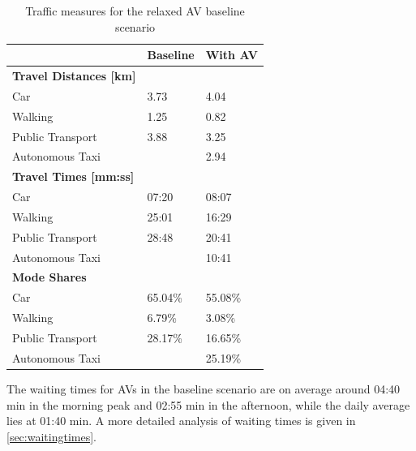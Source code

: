 \begin{table}[]
\centering
\caption{Traffic measures for the relaxed AV baseline scenario}
\label{tab:withwithoutav}
\begin{tabular}{@{}lll@{}}
\toprule
                                   & \textbf{Baseline} & \textbf{With AV} \\ \midrule
\textbf{Travel Distances {[}km{]}} &                   &                  \\
Car                                & 3.73              & 4.04             \\
Walking                            & 1.25              & 0.82             \\
Public Transport                   & 3.88              & 3.25             \\
Autonomous Taxi                    &                   & 2.94             \\
\textbf{Travel Times {[}mm:ss{]}}  &                   &                  \\
Car                                & 07:20             & 08:07            \\
Walking                            & 25:01             & 16:29            \\
Public Transport                   & 28:48             & 20:41            \\
Autonomous Taxi                    &                   & 10:41            \\
\textbf{Mode Shares}               &                   &                  \\
Car                                & 65.04\%           & 55.08\%          \\
Walking                            & 6.79\%            & 3.08\%           \\
Public Transport                   & 28.17\%           & 16.65\%          \\
Autonomous Taxi                    &                   & 25.19\%          \\ \bottomrule
\end{tabular}
\end{table}

The waiting times for AVs in the baseline scenario are on average around 04:40 min in the morning peak
and 02:55 min in the afternoon, while the daily average lies at 01:40 min. A more
detailed analysis of waiting times is given in \cref{sec:waitingtimes}.

